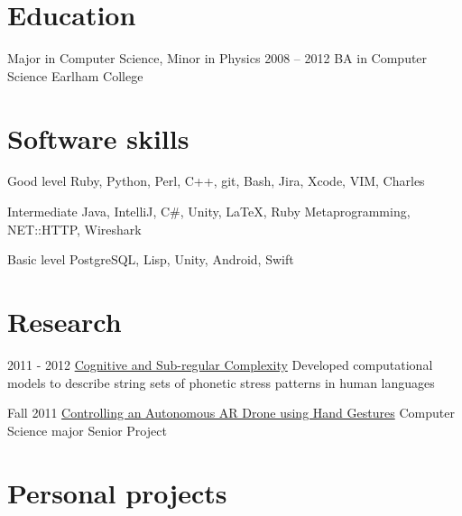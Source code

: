 \documentclass{tccv}
\begin{document}
\section{Education}

\begin{yearlist}

\item[Major in Computer Science, Minor in Physics]{2008 -- 2012}
     {BA in Computer Science}
     {Earlham College}

\end{yearlist}

\section{Software skills}

\begin{factlist}

\item{Good level}
     {Ruby, Python, Perl, C++, git, Bash, Jira, Xcode, VIM, Charles}

\item{Intermediate}
     {Java, IntelliJ, C\#, Unity, \LaTeX, Ruby Metaprogramming, NET::HTTP, Wireshark}

\item{Basic level}
     {PostgreSQL, Lisp, Unity, Android, Swift}

\end{factlist}

\section{Research}

\begin{yearlist}
\item{2011 - 2012}
     {\href{http://link.springer.com/chapter/10.1007/978-3-642-39998-5_6\#page-1}{Cognitive and Sub-regular Complexity}}
     {Developed computational models to describe string sets of phonetic stress patterns in human languages}

\item{Fall 2011}
     {\href{https://www.youtube.com/watch?v=69phrToFKyI}{Controlling an Autonomous AR Drone using Hand Gestures}}
     {Computer Science major Senior Project}
\end{yearlist}

\section{Personal projects}
\end{document}
